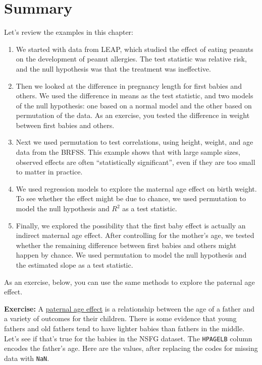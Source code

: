 \hypertarget{summary}{%
\section{Summary}\label{summary}}

Let's review the examples in this chapter:

\begin{enumerate}
\def\labelenumi{\arabic{enumi}.}
\item
  We started with data from LEAP, which studied the effect of eating
  peanuts on the development of peanut allergies. The test statistic was
  relative risk, and the null hypothesis was that the treatment was
  ineffective.
\item
  Then we looked at the difference in pregnancy length for first babies
  and others. We used the difference in means as the test statistic, and
  two models of the null hypothesis: one based on a normal model and the
  other based on permutation of the data. As an exercise, you tested the
  difference in weight between first babies and others.
\item
  Next we used permutation to test correlations, using height, weight,
  and age data from the BRFSS. This example shows that with large sample
  sizes, observed effects are often ``statistically significant'', even
  if they are too small to matter in practice.
\item
  We used regression models to explore the maternal age effect on birth
  weight. To see whether the effect might be due to chance, we used
  permutation to model the null hypothesis and \(R^2\) as a test
  statistic.
\item
  Finally, we explored the possibility that the first baby effect is
  actually an indirect maternal age effect. After controlling for the
  mother's age, we tested whether the remaining difference between first
  babies and others might happen by chance. We used permutation to model
  the null hypothesis and the estimated slope as a test statistic.
\end{enumerate}

As an exercise, below, you can use the same methods to explore the
paternal age effect.

\textbf{Exercise:} A
\href{https://en.wikipedia.org/wiki/Paternal_age_effect}{paternal age
effect} is a relationship between the age of a father and a variety of
outcomes for their children. There is some evidence that young fathers
and old fathers tend to have lighter babies than fathers in the middle.
Let's see if that's true for the babies in the NSFG dataset. The
\passthrough{\lstinline!HPAGELB!} column encodes the father's age. Here
are the values, after replacing the codes for missing data with
\passthrough{\lstinline!NaN!}.

